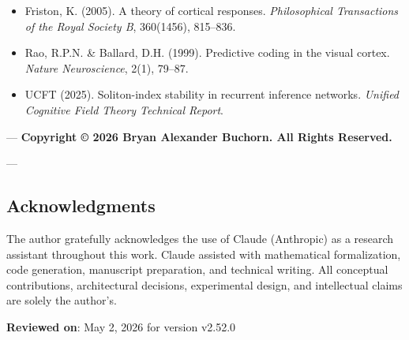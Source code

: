 \begin{itemize}
\item [friston\-2005\-theory] Friston, K. (2005). A theory of cortical responses. \textit{Philos\-ophical Transa\-ctions of the Royal Society B}, 360(1456), 815–836.
\item [rao\-1999\-predi\-ctive] Rao, R.P.N. \& Ballard, D.H. (1999). Predictive coding in the visual cortex. \textit{Nature Neuros\-cience}, 2(1), 79–87.
\item [ucft\-2025\-soliton] UCFT (2025). Soliton-index stability in recurrent inference networks. \textit{Unified Cognitive Field Theory Technical Report}.

\end{itemize}
---
\textbf{Copyright © 2026 Bryan Alexander Buchorn. All Rights Reserved.}

---
\subsection{Acknow\-ledgments}

The author gratefully ackno\-wledges the use of Claude (Anthropic) as a research assistant throughout this work. Claude assisted with mathe\-matical forma\-lization, code generation, manuscript preparation, and technical writing. All conceptual contr\-ibutions, archi\-tectural decisions, exper\-imental design, and intel\-lectual claims are solely the author's.

\textbf{Reviewed on}: May 2, 2026 for version v2.52.0
